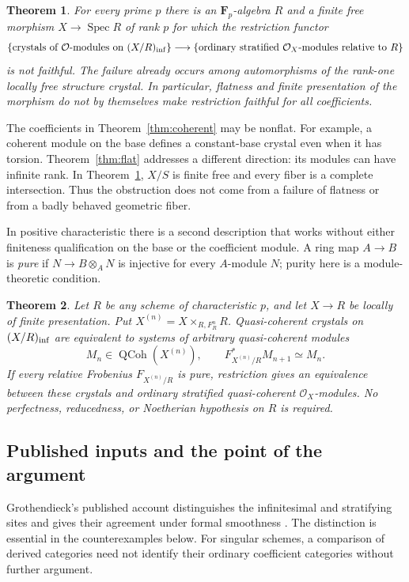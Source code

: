 \documentclass[11pt]{article}
\newcommand{\OO}{\mathcal O}\newcommand{\Fp}{\mathbf F_p}
\DeclareMathOperator{\Spec}{Spec}\DeclareMathOperator{\Hom}{Hom}
\newtheorem{theorem}{Theorem}[section]
\theoremstyle{definition}\newtheorem{definition}[theorem]{Definition}
\theoremstyle{remark}\newtheorem{remark}[theorem]{Remark}
\begin{document}
\begin{theorem}\label{thm:counterexample}
For every prime $p$ there is an $\Fp$-algebra $R$ and a finite free morphism $X\to\Spec R$ of rank $p$ for which the restriction functor
\[
 \{\text{crystals of $\OO$-modules on $(X/R)_{\rm inf}$}\}
 \longrightarrow
 \{\text{ordinary stratified $\OO_X$-modules relative to $R$}\}
\]
is not faithful.  The failure already occurs among automorphisms of the rank-one locally free structure crystal.  In particular, flatness and finite presentation of the morphism do not by themselves make restriction faithful for all coefficients.
\end{theorem}

The coefficients in Theorem~\ref{thm:coherent} may be nonflat. For example, a coherent module on the base defines a constant-base crystal even when it has torsion. Theorem~\ref{thm:flat} addresses a different direction: its modules can have infinite rank. In Theorem~\ref{thm:counterexample}, $X/S$ is finite free and every fiber is a complete intersection. Thus the obstruction does not come from a failure of flatness or from a badly behaved geometric fiber.

In positive characteristic there is a second description that works without either finiteness qualification on the base or the coefficient module. A ring map $A\to B$ is \emph{pure} if $N\to B\otimes_A N$ is injective for every $A$-module $N$; purity here is a module-theoretic condition.

\begin{theorem}\label{thm:frobenius}
Let $R$ be any scheme of characteristic $p$, and let $X\to R$ be locally of finite presentation.  Put $X^{(n)}=X\times_{R,F_R^n}R$.  Quasi-coherent crystals on $(X/R)_{\rm inf}$ are equivalent to systems of arbitrary quasi-coherent modules
\[
 M_n\in\operatorname{QCoh}(X^{(n)}),\qquad
 F_{X^{(n)}/R}^*M_{n+1}\simeq M_n.
\]
If every relative Frobenius $F_{X^{(n)}/R}$ is pure, restriction gives an equivalence between these crystals and ordinary stratified quasi-coherent $\OO_X$-modules.  No perfectness, reducedness, or Noetherian hypothesis on $R$ is required.
\end{theorem}

\subsection{Published inputs and the point of the argument}

Grothendieck's published account distinguishes the infinitesimal and stratifying sites and gives their agreement under formal smoothness \citep[\S4.1--4.2, pp.~331--333]{Grothendieck1968}. The distinction is essential in the counterexamples below. For singular schemes, a comparison of derived categories need not identify their ordinary coefficient categories without further argument.
\end{document}
